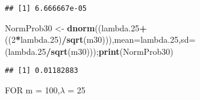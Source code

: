 \documentclass[
]{article}
\newenvironment{Shaded}{\begin{snugshade}}{\end{snugshade}}
\newcommand{\DataTypeTok}[1]{\textcolor[rgb]{0.13,0.29,0.53}{#1}}
\newcommand{\DecValTok}[1]{\textcolor[rgb]{0.00,0.00,0.81}{#1}}
\newcommand{\FloatTok}[1]{\textcolor[rgb]{0.00,0.00,0.81}{#1}}
\newcommand{\KeywordTok}[1]{\textcolor[rgb]{0.13,0.29,0.53}{\textbf{#1}}}
\newcommand{\NormalTok}[1]{#1}
\newcommand{\OperatorTok}[1]{\textcolor[rgb]{0.81,0.36,0.00}{\textbf{#1}}}
\newcommand{\StringTok}[1]{\textcolor[rgb]{0.31,0.60,0.02}{#1}}
\begin{document}
\begin{verbatim}
## [1] 6.666667e-05
\end{verbatim}

\begin{Shaded}
\begin{Highlighting}[]
\NormalTok{NormProb30 <-}\StringTok{ }\KeywordTok{dnorm}\NormalTok{((lambda}\FloatTok{.25}\OperatorTok{+}\NormalTok{((}\DecValTok{2}\OperatorTok{*}\NormalTok{lambda}\FloatTok{.25}\NormalTok{)}\OperatorTok{/}\KeywordTok{sqrt}\NormalTok{(m30))),}\DataTypeTok{mean=}\NormalTok{lambda}\FloatTok{.25}\NormalTok{,}\DataTypeTok{sd=}\NormalTok{(lambda}\FloatTok{.25}\OperatorTok{/}\KeywordTok{sqrt}\NormalTok{(m30)));}\KeywordTok{print}\NormalTok{(NormProb30)}
\end{Highlighting}
\end{Shaded}

\begin{verbatim}
## [1] 0.01182883
\end{verbatim}

FOR m = 100,\(\lambda\) = 25
\end{document}
